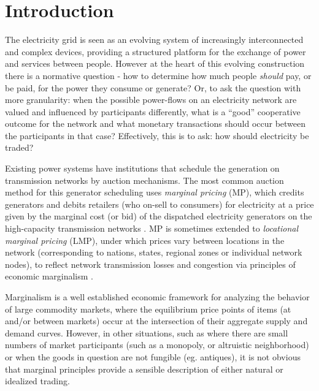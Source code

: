 \section{Introduction}
The electricity grid is seen as an evolving system of increasingly interconnected and complex devices, providing a structured platform for the exchange of power and services between people.
However at the heart of this evolving construction there is a normative question - how to determine how much people \textit{should} pay, or be paid, for the power they consume or generate?  
Or, to ask the question with more granularity: when the possible power-flows on an electricity network are valued and influenced by participants differently, what is a ``good'' cooperative outcome for the network and what monetary transactions should occur between the participants in that case? Effectively, this is to ask: how should electricity be traded?

\newif\iffigures

\figurestrue %

Existing power systems have institutions that schedule the generation on transmission networks by auction mechanisms. 
The most common auction method for this generator scheduling uses \textit{marginal pricing} (MP), which credits generators and debits retailers (who on-sell to consumers) for electricity at a price given by the marginal cost (or bid) of the dispatched electricity generators on the high-capacity transmission networks \cite{auctions1}.
MP is sometimes extended to \textit{locational marginal pricing} (LMP), under which prices vary between locations in the network (corresponding to nations, states, regional zones or individual network nodes), to reflect network transmission losses and congestion \cite{lmp1,lmp2,game3} via principles of economic marginalism \cite{marginalism1,Clarke1991}.

Marginalism is a well established economic framework for analyzing the behavior of large commodity markets, where the equilibrium price points of items (at and/or between markets) occur at the intersection of their aggregate supply and demand curves.
However, in other situations, such as where there are small numbers of market participants (such as a monopoly, or altruistic neighborhood) or when the goods in question are not fungible (eg. antiques), it is not obvious that marginal principles provide a sensible description of either natural or idealized trading.

